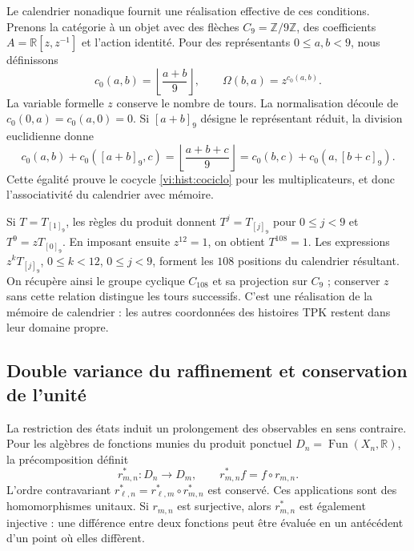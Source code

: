 Le calendrier nonadique fournit une réalisation effective de ces
conditions. Prenons la catégorie à un objet avec des flèches
\(C_9=\mathbb Z/9\mathbb Z\), des coefficients
\(A=\mathbb R[z,z^{-1}]\) et l’action identité. Pour des représentants
\(0\le a,b<9\), nous définissons
\begin{equation}
 c_0(a,b)=\left\lfloor\frac{a+b}{9}\right\rfloor,
 \qquad\Omega(b,a)=z^{c_0(a,b)}.
 \label{vi:hist:carry-calendario}
\end{equation}
La variable formelle \(z\) conserve le nombre de tours. La normalisation
découle de \(c_0(0,a)=c_0(a,0)=0\). Si \([a+b]_9\) désigne le
représentant réduit, la division euclidienne donne
\[
 c_0(a,b)+c_0([a+b]_9,c)
 =\left\lfloor\frac{a+b+c}{9}\right\rfloor
 =c_0(b,c)+c_0(a,[b+c]_9).
\]
Cette égalité prouve le cocycle \eqref{vi:hist:cociclo} pour les
multiplicateurs, et donc l’associativité du calendrier avec mémoire.

Si \(T=T_{[1]_9}\), les règles du produit donnent
\(T^j=T_{[j]_9}\) pour \(0\le j<9\) et \(T^9=zT_{[0]_9}\).
En imposant ensuite \(z^{12}=1\), on obtient \(T^{108}=1\).
Les expressions \(z^kT_{[j]_9}\), \(0\le k<12\), \(0\le j<9\),
forment les \(108\) positions du calendrier résultant. On récupère ainsi
le groupe cyclique \(C_{108}\) et sa projection sur \(C_9\) ; conserver
\(z\) sans cette relation distingue les tours successifs. C’est une
réalisation de la mémoire de calendrier : les autres coordonnées des
histoires TPK restent dans leur domaine propre.

\subsection{Double variance du raffinement et conservation de l’unité}
\label{hist:doble-varianza}

La restriction des états induit un prolongement des observables en sens
contraire. Pour les algèbres de fonctions munies du produit ponctuel
\(D_n=\operatorname{Fun}(X_n,\mathbb R)\), la précomposition définit
\begin{equation}
 r_{m,n}^*:D_n\longrightarrow D_m,
 \qquad r_{m,n}^*f=f\circ r_{m,n}.
 \label{vi:hist:precomposicion}
\end{equation}
L’ordre contravariant
\(r_{\ell,n}^*=r_{\ell,m}^*\circ r_{m,n}^*\) est conservé. Ces applications
sont des homomorphismes unitaux. Si \(r_{m,n}\) est surjective, alors
\(r_{m,n}^*\) est également injective : une différence entre deux fonctions peut
être évaluée en un antécédent d’un point où elles diffèrent.

